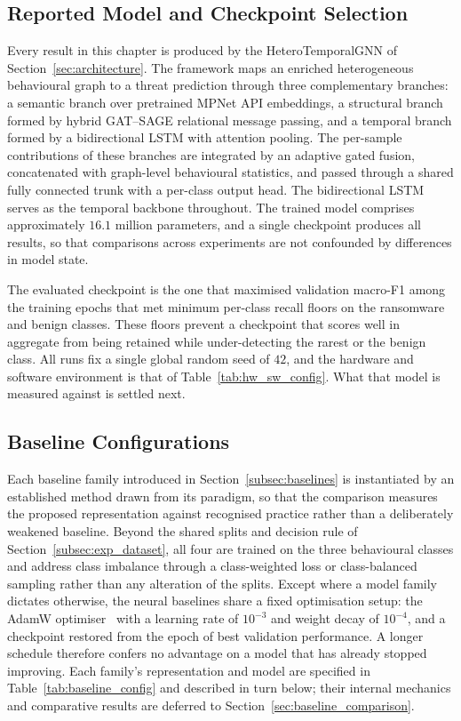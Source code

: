 \documentclass[%
    BCOR=10mm,
    DIV=13,
    toc=bibliography,
    toc=listof,
    oneside,
    12pt,
]{scrbook}
\begin{document}
\subsection{Reported Model and Checkpoint Selection}
\label{subsec:exp_checkpoint}

Every result in this chapter is produced by the HeteroTemporalGNN of
Section~\ref{sec:architecture}. The framework maps an enriched heterogeneous
behavioural graph to a threat prediction through three complementary branches:
a semantic branch over pretrained MPNet API embeddings, a structural branch
formed by hybrid GAT--SAGE relational message passing, and a temporal branch
formed by a bidirectional LSTM with attention pooling. The per-sample
contributions of these branches are integrated by an adaptive gated fusion,
concatenated with graph-level behavioural statistics, and passed through a
shared fully connected trunk with a per-class output head. The bidirectional
LSTM serves as the temporal backbone throughout. The trained model comprises
approximately $16.1$ million
parameters, and a single checkpoint produces all results, so that comparisons
across experiments are not confounded by differences in model state.

The evaluated checkpoint is the one that maximised validation macro-F1 among the
training epochs that met minimum per-class recall floors on the ransomware and
benign classes. These floors prevent a checkpoint that scores well in aggregate
from being retained while under-detecting the rarest or the benign class. All
runs fix a single global random seed of $42$, and the hardware and software
environment is that of Table~\ref{tab:hw_sw_config}. What that model is measured
against is settled next.

\subsection{Baseline Configurations}
\label{subsec:exp_baseline_config}

Each baseline family introduced in Section~\ref{subsec:baselines} is instantiated
by an established method drawn from its paradigm, so that the comparison measures
the proposed representation against recognised practice rather than a
deliberately weakened baseline. Beyond the shared splits and decision rule of
Section~\ref{subsec:exp_dataset}, all four are trained on the three behavioural
classes and address class imbalance through a class-weighted loss or
class-balanced sampling rather than any alteration of the splits. Except where a
model family dictates otherwise, the neural baselines share a fixed optimisation
setup: the AdamW optimiser~\cite{loshchilov2019adamw} with a learning rate of
$10^{-3}$ and weight decay of $10^{-4}$, and a checkpoint restored from the
epoch of best validation performance. A longer schedule therefore confers no
advantage on a model that has already stopped improving. Each family's
representation and model are
specified in Table~\ref{tab:baseline_config} and described in turn below; their
internal mechanics and comparative results are deferred to
Section~\ref{sec:baseline_comparison}.
\end{document}
